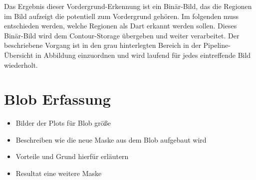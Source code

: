 Das Ergebnis dieser Vordergrund-Erkennung ist ein Binär-Bild, das die Regionen im Bild aufzeigt die potentiell zum Vordergrund gehören. Im folgenden muss entschieden werden, welche Regionen als Dart erkannt werden sollen. Dieses Binär-Bild wird dem Contour-Storage übergeben und weiter verarbeitet. Der beschriebene Vorgang ist in den grau hinterlegten Bereich in der Pipeline-Übersicht in Abbildung einzuordnen und wird laufend für jedes eintreffende Bild wiederholt.



\section{Blob Erfassung}
\label{sec:blob}

\begin{itemize}
\item Bilder der Plots für Blob größe
\item Beschreiben wie die neue Maske aus dem Blob aufgebaut wird
\item Vorteile und Grund hierfür erläutern
\item Resultat eine weitere Maske 
\end{itemize}

